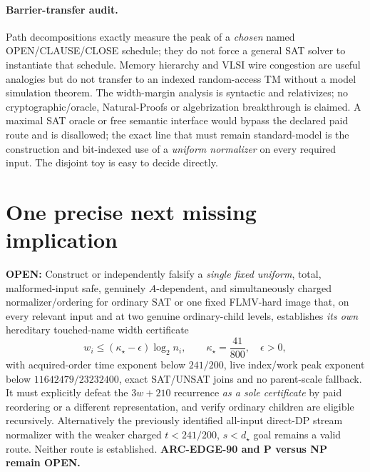 \documentclass[11pt]{article}
\newcommand{\OPEN}{\textbf{OPEN}}
\begin{document}
\paragraph{Barrier-transfer audit.}
Path decompositions exactly measure the
peak of a \emph{chosen} named OPEN/CLAUSE/CLOSE
schedule; they do not force a general SAT solver
to instantiate that schedule.
Memory hierarchy and VLSI wire congestion
are useful analogies but do not transfer to
an indexed random-access TM without a model
simulation theorem.
The width-margin analysis is syntactic and
relativizes; no cryptographic/oracle,
Natural-Proofs or algebrization breakthrough
is claimed.  A maximal SAT oracle or
free semantic interface would bypass
the declared paid route and is disallowed;
the exact line that must remain standard-model
is the construction and bit-indexed use of a
\emph{uniform normalizer} on every required input.
The disjoint toy is easy to decide directly.

\section{One precise next missing implication}
\textbf{\OPEN{}:} Construct or independently falsify
a \emph{single fixed uniform}, total, malformed-input
safe, genuinely $A$-dependent, and simultaneously
charged normalizer/ordering for ordinary SAT
or one fixed FLMV-hard image that, on every
relevant input and at two genuine ordinary-child
levels, establishes \emph{its own} hereditary
touched-name width certificate
\[
 w_i\le(\kappa_\star-\epsilon)\log_2n_i,\qquad
 \kappa_\star=\frac{41}{800},\quad\epsilon>0,
\]
with acquired-order time exponent below $241/200$,
live index/work peak exponent below
$11642479/23232400$, exact SAT/UNSAT joins
and no parent-scale fallback.
It must explicitly defeat the $3w+210$
recurrence \emph{as a sole certificate}
by paid reordering or a different
representation, and verify ordinary children
are eligible recursively.  Alternatively the
previously identified all-input direct-DP
stream normalizer with the weaker charged
$t<241/200$, $s<d_\star$ goal remains a valid
route.  Neither route is established.
\textbf{ARC-EDGE-90 and P versus NP remain OPEN.}
\end{document}
